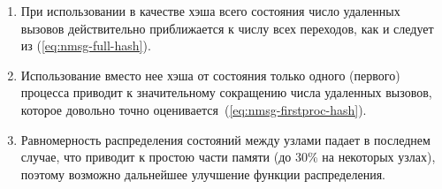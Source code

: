 \begin{enumerate}
\item При использовании в качестве  хэша всего состояния число
  удаленных вызовов действительно приближается к числу всех переходов, как и
  следует из (\ref{eq:nmsg-full-hash}).

\item Использование вместо нее хэша от состояния только одного (первого)
  процесса приводит к значительному сокращению числа удаленных
  вызовов, которое довольно точно оценивается~(\ref{eq:nmsg-firstproc-hash}).

\item Равномерность распределения состояний между узлами падает в последнем
  случае, что приводит к простою части памяти  (до 30\% на некоторых узлах),
  поэтому возможно дальнейшее улучшение функции распределения.
\end{enumerate}





